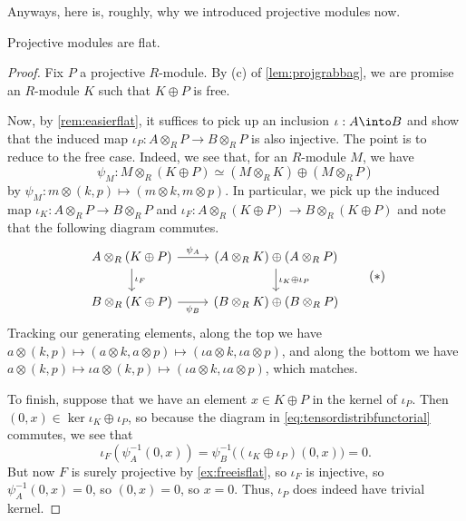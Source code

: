 Anyways, here is, roughly, why we introduced projective modules now.
\begin{prop}
	Projective modules are flat.
\end{prop}
\begin{proof}
	Fix $P$ a projective $R$-module. By (c) of \autoref{lem:projgrabbag}, we are promise an $R$-module $K$ such that $K\oplus P$ is free.

	Now, by \autoref{rem:easierflat}, it suffices to pick up an inclusion $\iota:A\into B$ and show that the induced map $\iota_P:A\otimes_RP\to B\otimes_RP$ is also injective. The point is to reduce to the free case. Indeed, we see that, for an $R$-module $M$, we have
	\[\psi_M:M\otimes_R(K\oplus P)\simeq(M\otimes_RK)\oplus(M\otimes_RP)\]
	by $\psi_M:m\otimes(k,p)\mapsto(m\otimes k,m\otimes p)$. In particular, we pick up the induced map $\iota_K:A\otimes_RP\to B\otimes_RP$ and $\iota_F:A\otimes_R(K\oplus P)\to B\otimes_R(K\oplus P)$ and note that the following diagram commutes.
	\[\begin{tikzcd}
		{A\otimes_R(K\oplus P)} & {(A\otimes_RK)\oplus(A\otimes_RP)} \\
		{B\otimes_R(K\oplus P)} & {(B\otimes_RK)\oplus(B\otimes_RP)}
		\arrow["{\iota_F}", from=1-1, to=2-1]
		\arrow["{\iota_K\oplus\iota_P}", from=1-2, to=2-2]
		\arrow["{\psi_A}", from=1-1, to=1-2]
		\arrow["{\psi_B}"', from=2-1, to=2-2]
	\end{tikzcd}\tag{$*$}\label{eq:tensordistribfunctorial}\]
	Tracking our generating elements, along the top we have $a\otimes(k,p)\mapsto(a\otimes k,a\otimes p)\mapsto(\iota a\otimes k,\iota a\otimes p)$, and along the bottom we have $a\otimes(k,p)\mapsto\iota a\otimes(k,p)\mapsto(\iota a\otimes k,\iota a\otimes p)$, which matches.

	To finish, suppose that we have an element $x\in K\oplus P$ in the kernel of $\iota_P$. Then $(0,x)\in\ker\iota_K\oplus\iota_P$, so because the diagram in \autoref{eq:tensordistribfunctorial} commutes, we see that
	\[\iota_F\left(\psi_A^{-1}(0,x)\right)=\psi_B^{-1}\big((\iota_K\oplus\iota_P)(0,x)\big)=0.\]
	But now $F$ is surely projective by \autoref{ex:freeisflat}, so $\iota_F$ is injective, so $\psi_A^{-1}(0,x)=0$, so $(0,x)=0$, so $x=0$. Thus, $\iota_P$ does indeed have trivial kernel.
\end{proof}


